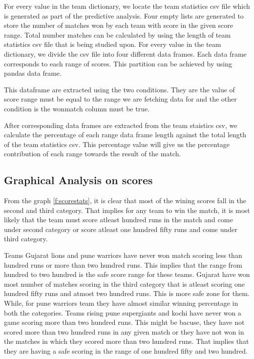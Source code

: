 \documentclass[sigconf]{acmart}
\begin{document}
For every value in the team dictionary, we locate the team statistics csv file which is generated as part of the predictive analysis. Four empty lists are generated to store the number of matches won by each team with score in the given score range. Total number matches can be calculated by using the length of team statistics csv file that is being studied upon. For every value in the team dictionary, we divide the csv file into four different data frames. Each data frame corresponds to each range of scores. This partition can be achieved by using pandas data frame.

This dataframe are extracted using the two conditions. They are the value of score range must be equal to the range we are fetching data for and the other condition is the wonmatch column must be true.  

After corresponding data frames are extracted from the team staistics csv, we calculate the percentage of each range data frame length against the total length of the team statistics csv. This percentage value will give us the percentage contribution of each range towards the result of the match.

\subsection{Graphical Analysis on scores}

From the graph \ref{f:scorestats}, it is clear that most of the wining scores fall in the second and third category. That implies for any team to win the match, it is most likely that the team must score atleast hundred runs in the match and come under second category or score atleast one hundred fifty runs and come under third category. 


Teams Gujarat lions and pune warriors have never won match scoring less than hundred runs or more than two hundred runs. This implies that the range from hundred to two hundred is the safe score range for these teams. Gujarat have won most number of matches scoring in the third category that is atleast scoring one hundred fifty runs and atmost two hundred runs. This is more safe zone for them. While, for pune warriors team they have almost similar winning percentage in both the categories. 
Teams rising pune supergiants and kochi have never won a game scoring more than two hundred runs. This might be bacuse, they have not scored more than two hundred runs in any given match or they have not won in the matches  in which they scored more than two hundred runs. That implies that they are having a safe scoring in the range of one hundred fifty and two hundred.
\end{document}

